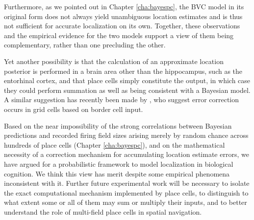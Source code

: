 Furthermore, as we pointed out in Chapter \ref{cha:bayespc}, the BVC model in its original form does not always yield unambiguous location estimates and is thus not sufficient for accurate localization on its own. Together, these observations and the empirical evidence for the two models support a view of them being complementary, rather than one precluding the other.

Yet another possibility is that the calculation of an approximate location posterior is performed in a brain area other than the hippocampus, such as the entorhinal cortex, and that place cells simply constitute the output, in which case they could perform summation as well as being consistent with a Bayesian model. A similar suggestion has recently been made by \cite{hardcastle2015environmental}, who suggest error correction occurs in grid cells based on border cell input.

Based on the near impossibility of the strong correlations between Bayesian predictions and recorded firing field sizes arising merely by random chance across hundreds of place cells (Chapter \ref{cha:bayespc}), and on the mathematical necessity of a correction mechanism for accumulating location estimate errors, we have argued for a probabilistic framework to model localization in biological cognition. We think this view has merit despite some empirical phenomena inconsistent with it. Further future experimental work will be necessary to isolate the exact computational mechanism implemented by place cells, to distinguish to what extent some or all of them may sum or multiply their inputs, and to better understand the role of multi-field place cells in spatial navigation. 










